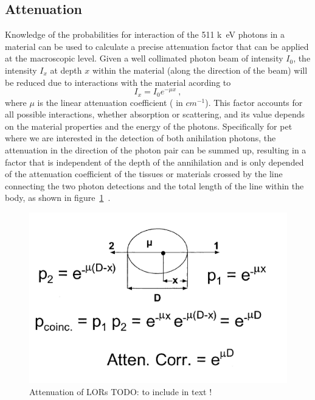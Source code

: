 \subsection{Attenuation}
Knowledge of the probabilities for interaction of the 511 \si{k\electronvolt} photons in a material can be used to calculate a precise attenuation factor that can be applied at the macroscopic level. Given a well collimated photon beam of intensity $I_0$, the intensity $I_x$ at depth $x$ within the material (along the direction of the beam) will be reduced due to interactions with the material acording to
\begin{equation} \label{Attenuation}
I_x = I_0 e^{-\mu x} \ ,
\end{equation}
where $\mu$ is the linear attenuation coefficient ( in $cm^{-1}$). This factor accounts for all possible interactions, whether absorption or scattering, and its value depends on the material properties and the energy of the photons.
%
Specifically for \gls{pet} where we are interested in the detection of both anihilation photons, the attenuation in the direction of the photon pair can be summed up, resulting in a factor that is independent of the depth of the annihilation and is only depended of the attenuation coefficient of the tissues or materials crossed by the line connecting the two photon detections and the total length of the line within the body, as shown in figure~\ref{fig_2:511_attenuation}~\cite{Phelps1975}. 

\begin{figure} [h!]
\centering
\includegraphics[scale=0.45,angle=0]{2_Theory_Methods/figures/Phelps_LOR_attenuation_correction.png}
\caption{Attenuation of LORs TODO:  to include in text ! } 
\label{fig_2:511_attenuation}
\end{figure} 

